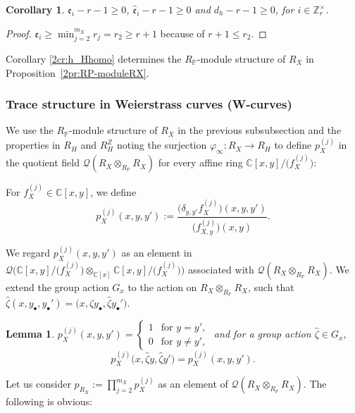 \documentclass[10pt,a4paper]{amsart}
\def\CC{{\mathbb C}}
\def\ZZ{{\mathbb Z}}
\def\PP{{\mathbb P}}
\def\cQ{{\mathcal Q}}
\def\fe{{\mathfrak e}}
\def\hfe{{\widehat{\mathfrak e}}}
\def\hzeta{{\widehat \zeta}}
\numberwithin{equation}{section}
\newtheorem{Corollary}[Theorem]{Corollary}
\newtheorem{Lemma}[Theorem]{Lemma}
\begin{document}
\begin{Corollary}\label{2cr:h_X-h_X}
$\fe_i-r -1 \ge 0$, $\hfe_i -r -1 \ge 0$ and $d_h - r -1 \ge 0$, for $i \in \ZZ_r^\times$.
\end{Corollary}

\begin{proof}
$\fe_i\ge \min_{j=2}^{m_X} r_j = r_2\ge r+1$ because of $r+1 \le r_2$.
\end{proof}

\begin{Remark}\label{2rk:RP-moduleRX2}
Corollary \ref{2cr:h_Hhomo} determines the $R_\PP$-module structure of $R_X$ in Proposition~\ref{2pr:RP-moduleRX}.
\end{Remark}

\subsubsection{Trace structure in Weierstrass curves (W-curves)}\label{2sssc:TraceStrWcurves}

We use the $R_\PP$-module structure of $R_X$ in the previous subsubsection and the properties in $R_H$ and $R_H^Z$ noting the surjection $\varphi_\infty\colon R_X\to R_H$ to define $p_X^{(j)}$ in the quotient field $\cQ(R_X\otimes_{R_\PP} R_X)$ for every affine ring $\CC[x,y]/\big(f_X^{(j)}\big)$:
\begin{Definition}\label{2df:p_Xj}
For $f_X^{(j)}\in \CC[x, y]$, we define
\[
p_X^{(j)}(x,y,y'):=\frac{
\big(\delta_{y,y'} f_X^{(j)}\big)(x,y,y')}{\big(f_{X,y}^{(j)}\big)(x,y)}.
\]
\end{Definition}

We regard $p_X^{(j)}(x,y,y')$ as an element in $\cQ\big(\CC[x,y]/\big(f_X^{(j)}\big)\otimes_{\CC[x]} \CC[x,y]/\big(f_X^{(j)}\big)\big)$ associated with $\cQ(R_X\otimes_{R_\PP} R_X)$.
We extend the group action $G_x$ to the action on $R_X\otimes_{R_\PP} R_X$, such that $\hzeta (x, y_\bullet, y_\bullet')= \big(x, \hzeta y_\bullet, \hzeta y_\bullet'\big)$.

\begin{Lemma}\label{2lm:p_Xj}
$p_X^{(j)}(x,y,y')=\begin{cases}
1 & \text{for } y = y',\\
0 & \text{for } y \neq y',
\end{cases}$
and for a group action
$\hzeta\in G_x$,
\[
p_X^{(j)}\big(x,\hzeta y,\hzeta y'\big)=p_X^{(j)}(x,y,y').
\]
\end{Lemma}

Let us consider $p_{R_X}:=\prod_{j=2}^{m_X} p_X^{(j)}$ as an element of $\cQ(R_X\otimes_{R_\PP} R_X)$.
The following is obvious:
\end{document}
